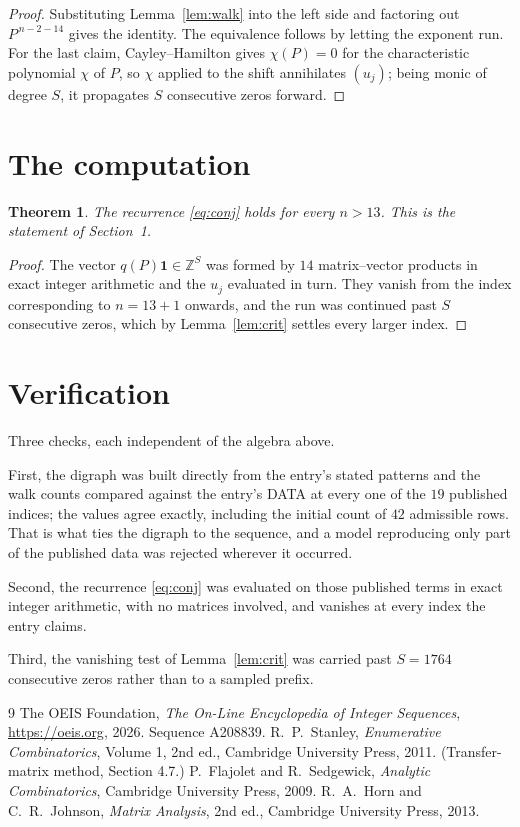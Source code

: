 \documentclass[11pt,a4paper]{article}
\theoremstyle{plain}
\newtheorem{theorem}{Theorem}
\theoremstyle{definition}
\begin{document}
\begin{proof}
Substituting Lemma~\ref{lem:walk} into the left side and factoring out
$P^{\,n-2-14}$ gives the identity. The equivalence follows by letting the exponent
run. For the last claim, Cayley--Hamilton gives $\chi(P)=0$ for the characteristic
polynomial $\chi$ of $P$, so $\chi$ applied to the shift annihilates $(u_j)$; being monic of
degree $S$, it propagates $S$ consecutive zeros forward.
\end{proof}

\section{The computation}

\begin{theorem}
The recurrence \eqref{eq:conj} holds for every $n>13$. This is the statement of
Section~1.
\end{theorem}

\begin{proof}
The vector $q(P)\mathbf{1}\in\mathbb{Z}^{S}$ was formed by $14$ matrix--vector
products in exact integer arithmetic and the $u_j$ evaluated in turn. They vanish from the
index corresponding to $n=13+1$ onwards, and the run was continued past $S$ consecutive
zeros, which by Lemma~\ref{lem:crit} settles every larger index.
\end{proof}

\section{Verification}

Three checks, each independent of the algebra above.

First, the digraph was built directly from the entry's stated patterns and the walk counts
compared against the entry's DATA at every one of the $19$ published indices; the
values agree exactly, including the initial count of $42$ admissible rows. That is
what ties the digraph to the sequence, and a model reproducing only part of the published
data was rejected wherever it occurred.

Second, the recurrence \eqref{eq:conj} was evaluated on those published terms in exact
integer arithmetic, with no matrices involved, and vanishes at every index the entry claims.

Third, the vanishing test of Lemma~\ref{lem:crit} was carried past $S=1764$ consecutive
zeros rather than to a sampled prefix.

\begin{thebibliography}{9}
 The OEIS Foundation, \emph{The On-Line Encyclopedia of Integer
Sequences}, \url{https://oeis.org}, 2026. Sequence A208839.
 R.~P.~Stanley, \emph{Enumerative Combinatorics}, Volume 1, 2nd ed.,
Cambridge University Press, 2011. (Transfer-matrix method, Section 4.7.)
 P.~Flajolet and R.~Sedgewick, \emph{Analytic Combinatorics}, Cambridge
University Press, 2009.
 R.~A.~Horn and C.~R.~Johnson, \emph{Matrix Analysis}, 2nd ed., Cambridge
University Press, 2013.
\end{thebibliography}
\end{document}
